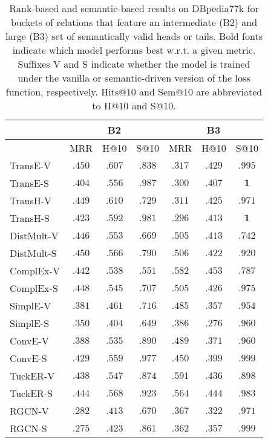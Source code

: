 \documentclass[letterpaper]{article} %
\begin{document}
\begin{table*}[h]
    \caption{Rank-based and semantic-based results on DBpedia77k for buckets of relations that feature an intermediate (B2) and large (B3) set of semantically valid heads or tails. Bold fonts indicate which model performs best w.r.t. a given metric. Suffixes V and S indicate whether the model is trained under the vanilla or semantic-driven version of the loss function, respectively. Hits@$10$ and Sem@$10$ are abbreviated to H@$10$ and S@$10$.}
    \setlength{\tabcolsep}{0.175cm}
    \centering
    \vspace{3mm}
    \begin{tabular}{lcccccc}
    \hline
    &\multicolumn{3}{c}{B2} & \multicolumn{3}{c}{B3}
                    \\\hline
                    & MRR & H@10 & S@10 &
                    MRR & H@10 & S@10 \\
\hline
				TransE-V&$\mathbf{.450}$&$\mathbf{.607}$&$.838$&$\mathbf{.317}$&$\mathbf{.429}$&$.995$\\
                    TransE-S &$.404$&$.556$&$\mathbf{.987}$&$.300$&$.407$&$\mathbf{1}$ \\
    \hline
                    TransH-V &$\mathbf{.449}$&$\mathbf{.610}$&$.729$&$\mathbf{.311}$&$\mathbf{.425}$&$.971$ \\
                    TransH-S &$.423$&$.592$&$\mathbf{.981}$&$.296$&$.413$&$\mathbf{1}$ \\
    \hline
                    DistMult-V &$.446$&$.553$&$.669$&$.505$&$.413$&$.742$ \\
				DistMult-S &$\mathbf{.450}$&$\mathbf{.566}$&$\mathbf{.790}$&$\mathbf{.506}$&$\mathbf{.422}$&$\mathbf{.920}$ \\
    \hline
    ComplEx-V &$.442$&$.538$&$.551$&$\mathbf{.582}$&$\mathbf{.453}$&$.787$ \\
    			ComplEx-S &$\mathbf{.448}$&$\mathbf{.545}$&$\mathbf{.707}$&$.505$&$.426$&$\mathbf{.975}$ \\
    \hline
                    SimplE-V &$\mathbf{.381}$&$\mathbf{.461}$&$\mathbf{.716}$&$\mathbf{.485}$&$\mathbf{.357}$&$.954$ \\
                    SimplE-S &$.350$&$.404$&$.649$&$.386$&$.276$&$\mathbf{.960}$ \\
    \hline
				ConvE-V &$.388$&$.535$&$.890$&$\mathbf{.489}$&$.371$&$.960$ \\
				ConvE-S&$\mathbf{.429}$&$\mathbf{.559}$&$\mathbf{.977}$&$.450$&$\mathbf{.399}$&$\mathbf{.999}$  \\
    \hline
    			TuckER-V &$.438$&$.547$&$.874$&$\mathbf{.591}$&$.436$&$.898$ \\
                   TuckER-S &$\mathbf{.444}$&$\mathbf{.568}$&$\mathbf{.923}$&$.564$&$\mathbf{.444}$&$\mathbf{.983}$ \\
    \hline
                    RGCN-V &$\mathbf{.282}$&$.413$&$.670$&$\mathbf{.367}$&$.322$&$.971$ \\
                    RGCN-S &$.275$&$\mathbf{.423}$&$\mathbf{.861}$&$.362$&$\mathbf{.357}$&$\mathbf{.999}$ \\
    \hline
    \end{tabular}
    \label{tab:db}
\end{table*}
\end{document}
